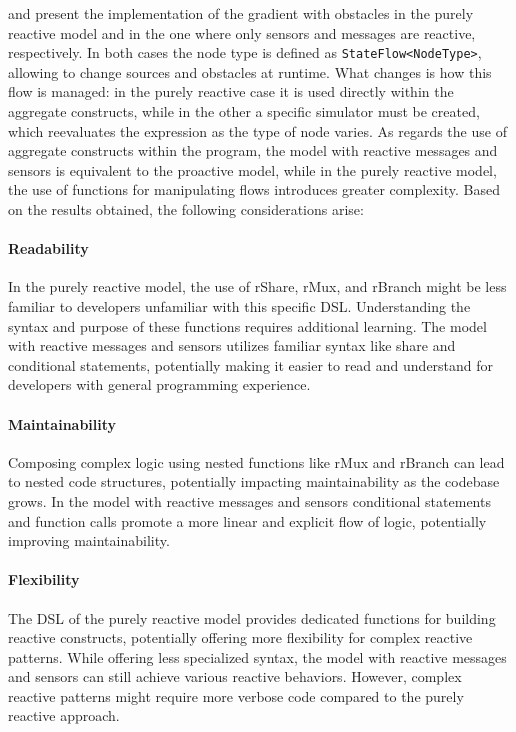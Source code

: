 and  present the implementation of the gradient with obstacles in the purely reactive model and in the one where only sensors and messages are reactive, respectively. In both cases the node type is defined as \texttt{StateFlow<NodeType>}, allowing to change sources and obstacles at runtime. What changes is how this flow is managed: in the purely reactive case it is used directly within the aggregate constructs, while in the other a specific simulator must be created, which reevaluates the expression as the type of node varies. As regards the use of aggregate constructs within the program, the model with reactive messages and sensors is equivalent to the proactive model, while in the purely reactive model, the use of functions for manipulating flows introduces greater complexity. Based on the results obtained, the following considerations arise:


\paragraph{Readability}

In the purely reactive model, the use of rShare, rMux, and rBranch might be less familiar to developers unfamiliar with this specific DSL. Understanding the syntax and purpose of these functions requires additional learning. The model with reactive messages and sensors utilizes familiar syntax like share and conditional statements, potentially making it easier to read and understand for developers with general programming experience.

\paragraph{Maintainability}

Composing complex logic using nested functions like rMux and rBranch can lead to nested code structures, potentially impacting maintainability as the codebase grows. In the model with reactive messages and sensors conditional statements and function calls promote a more linear and explicit flow of logic, potentially improving maintainability.

\paragraph{Flexibility}

The DSL of the purely reactive model provides dedicated functions for building reactive constructs, potentially offering more flexibility for complex reactive patterns. While offering less specialized syntax, the model with reactive messages and sensors can still achieve various reactive behaviors. However, complex reactive patterns might require more verbose code compared to the purely reactive approach.

